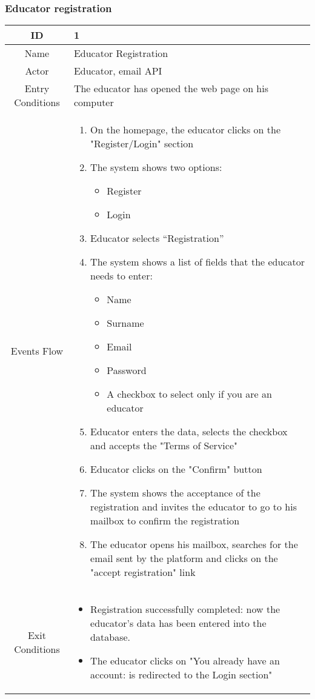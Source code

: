 \subsubsection{Educator registration}
\begin{longtable}{|c| p{10cm}|}
\hline
ID & 1 \\
\hline
Name & Educator Registration \\
\hline
Actor & Educator, email API \\
\hline
Entry Conditions &
The educator has opened the web page on his computer\\
\hline
Events Flow & \begin{enumerate}
\item On the homepage, the educator clicks on the "Register/Login" section
\item The system shows two options:
\begin{itemize}
\item Register
\item Login
\end{itemize}
\item Educator selects “Registration”
\item The system shows a list of fields that the educator needs to enter:
\begin{itemize}
\item Name
\item Surname
\item Email
\item Password
\item A checkbox to select only if you are an educator
\end{itemize}
\item Educator enters the data, selects the checkbox and accepts the "Terms of Service"
\item Educator clicks on the "Confirm" button
\item The system shows the acceptance of the registration and invites the educator to go to his mailbox to confirm the registration
\item The educator opens his mailbox, searches for the email sent by the platform and clicks on the "accept registration" link
\end{enumerate} \\
\hline
Exit Conditions &
\begin{itemize}
\item Registration successfully completed: now the educator's data has been entered into the database.
\item The educator clicks on "You already have an account: is redirected to the Login section"

\end{itemize}
\end{longtable}
